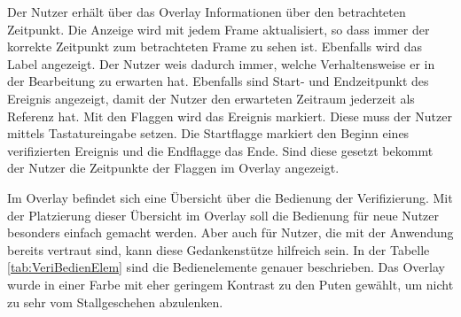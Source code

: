 

Der Nutzer erhält über das Overlay Informationen über den betrachteten Zeitpunkt. Die Anzeige wird mit jedem Frame aktualisiert, so dass immer der korrekte Zeitpunkt zum betrachteten Frame zu sehen ist. Ebenfalls wird das Label angezeigt. Der Nutzer weis dadurch immer, welche Verhaltensweise er in der Bearbeitung zu erwarten hat. Ebenfalls sind Start- und Endzeitpunkt des Ereignis angezeigt, damit der Nutzer den erwarteten Zeitraum jederzeit als Referenz hat. Mit den Flaggen wird das Ereignis markiert. Diese muss der Nutzer mittels Tastatureingabe setzen. Die Startflagge markiert den Beginn eines verifizierten Ereignis und die Endflagge das Ende. Sind diese gesetzt bekommt der Nutzer die Zeitpunkte der Flaggen im Overlay angezeigt. \par

Im Overlay befindet sich eine Übersicht über die Bedienung der Verifizierung. Mit der Platzierung dieser Übersicht im Overlay soll die Bedienung für neue Nutzer besonders einfach gemacht werden. Aber auch für Nutzer, die mit der Anwendung bereits vertraut sind, kann diese Gedankenstütze hilfreich sein. In der Tabelle \ref{tab:VeriBedienElem} sind die Bedienelemente genauer beschrieben. Das Overlay wurde in einer Farbe mit eher geringem Kontrast zu den Puten gewählt, um nicht zu sehr vom Stallgeschehen abzulenken. 

